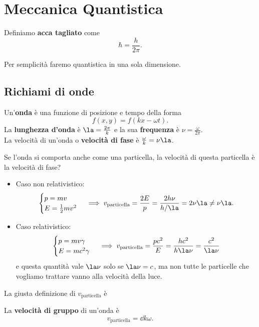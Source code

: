\chapter{Meccanica Quantistica}

\begin{definition}
Definiamo \textbf{acca tagliato} come
\[\hbar=\frac h{2\pi}.\]
\end{definition}

\noindent
Per semplicit\`a faremo quantistica in una sola dimensione.

\section{Richiami di onde}
\begin{definition}[Onda]
Un'\textbf{onda} \`e una funzione di posizione e tempo della forma
\[f(x,y)=f(kx-\omega t).\]
La \textbf{lunghezza d'onda} \`e $\la=\frac{2\pi}k$ e la sua \textbf{frequenza} \`e $\nu=\frac\omega{2\pi}$.\\
La velocit\`a di un'onda o \textbf{velocit\`a di fase} \`e $\frac{\omega}k=\nu\la$.
\end{definition}

\noindent
Se l'onda si comporta anche come una particella, la velocit\`a di questa particella \`e la velocit\`a di fase?
\begin{itemize}
\item Caso non relativistico:
\[\begin{cases}
p=mv\\
E=\frac12mv^2
\end{cases}\implies v_{\text{particella}}=\frac{2E}p=\frac{2h\nu}{h/\la}=2\nu\la\neq \nu\la.\]
\item Caso relativistico:
\[\begin{cases}
p=mv\gamma\\
E=mc^2\gamma
\end{cases}\implies v_{\text{particella}}=\frac{pc^2}E=\frac{hc^2}{h\la\nu}=\frac{c^2}{\la\nu}\]
e questa quantit\`a vale $\la\nu$ solo se $\la\nu=c$, ma non tutte le particelle che vogliamo trattare vanno alla velocit\`a della luce.
\end{itemize}
\noindent La giusta definizione di $v_{\text{particella}}$ \`e

\begin{definition}
La \textbf{velocit\`a di gruppo} di un'onda \`e
\[v_{\text{particella}}=\dd k\omega.\]
\end{definition}


